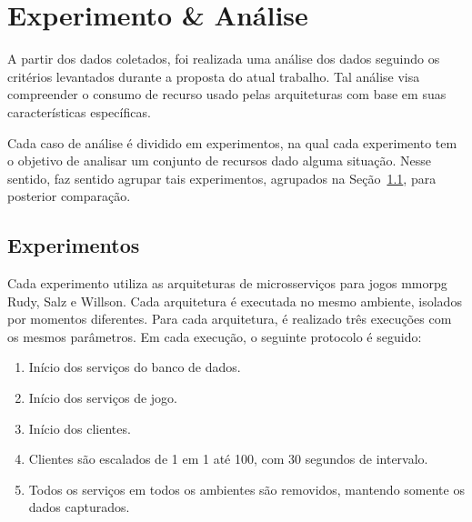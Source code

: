 \chapter{Experimento \& Análise}
\label{cap6}



A partir dos dados coletados, foi realizada uma análise dos dados seguindo os critérios levantados durante a proposta do atual trabalho.
%
Tal análise visa compreender o consumo de recurso usado pelas arquiteturas com base em suas características específicas.



Cada caso de análise é dividido em experimentos, na qual cada experimento tem o objetivo de analisar um conjunto de recursos dado alguma situação.
%
Nesse sentido, faz sentido agrupar tais experimentos, agrupados na Seção~\ref{sec:experimentos}, para posterior comparação.





\section{Experimentos}
\label{sec:experimentos}



Cada experimento utiliza as arquiteturas de microsserviços para jogos \ac{mmorpg} Rudy, Salz e Willson.
%
Cada arquitetura é executada no mesmo ambiente, isolados por momentos diferentes.
%
Para cada arquitetura, é realizado três execuções com os mesmos parâmetros.
%
Em cada execução, o seguinte protocolo é seguido:


\begin{enumerate}
 \item Início dos serviços do banco de dados.
 \item Início dos serviços de jogo.
 \item Início dos clientes.
 \item Clientes são escalados de 1 em 1 até 100, com 30 segundos de intervalo.
 \item Todos os serviços em todos os ambientes são removidos, mantendo somente os dados capturados.
\end{enumerate}



